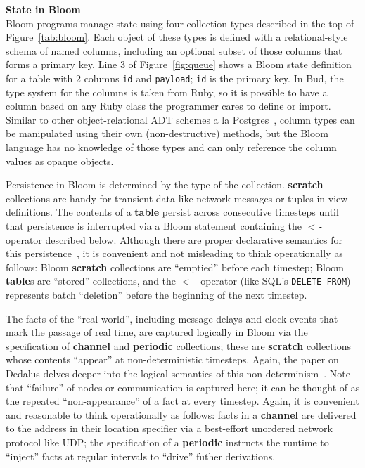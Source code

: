\noindent\textbf{State in Bloom}\\
\noindent
Bloom programs manage state using four collection types described in the top of Figure~\ref{tab:bloom}. Each object of these types is defined with a relational-style schema of named columns, including an optional subset of those columns that forms a primary key.  Line 3 of Figure~\ref{fig:queue} shows a Bloom state definition for a table with 2 columns \texttt{id} and \texttt{payload}; \texttt{id} is the primary key.  In Bud, the type system for the columns is taken from Ruby, so it is possible to have a column based on any Ruby class the programmer cares to define or import.  Similar to other object-relational ADT schemes a la Postgres~\cite{postgres-adt}, column types can be manipulated using their own (non-destructive) methods, but the Bloom language has no knowledge of those types and can only reference the column values as opaque objects.  

Persistence in Bloom is determined by the type of the collection.  \textbf{scratch} collections are handy for transient data like network messages or tuples in view definitions.  The contents of a \textbf{table} persist across consecutive timesteps until that persistence is interrupted via a Bloom statement containing the \texttt{$<$-} operator described below. Although there are proper declarative semantics for this persistence~\cite{dedalus-techr}, it is convenient and not misleading to think operationally as follows: Bloom \textbf{scratch} collections are ``emptied'' before each timestep; Bloom \textbf{table}s are ``stored'' collections, and the \texttt{$<$-} operator (like SQL's \texttt{DELETE FROM}) represents batch ``deletion'' before the beginning of the next timestep.

The facts of the ``real world'', including message delays and clock events that mark the passage of real time, are captured logically in Bloom via the specification of \textbf{channel} and \textbf{periodic} collections; these are \textbf{scratch} collections whose contents ``appear'' at non-deterministic timesteps. 
Again, the paper on Dedalus delves deeper into the logical semantics of this non-determinism~\cite{dedalus-techr}.  Note that ``failure'' of nodes or communication is captured here; it can be thought of as the repeated ``non-appearance'' of a fact at every timestep.  Again, it is convenient and reasonable to think operationally as follows: facts in a \textbf{channel} are delivered to the address in their location specifier via a best-effort unordered network protocol like UDP; the specification of a \textbf{periodic} instructs the runtime to ``inject'' facts at regular intervals to ``drive'' futher derivations.

